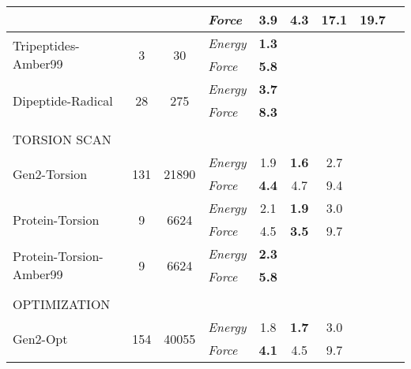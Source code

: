 \documentclass[varwidth]{standalone}
\newcommand{\widthbetweentype}{7pt}
\begin{document}
\begin{adjustbox}{width=\textwidth,center}
\begin{tabular}{l c c l c c c c c}
                                   &                       &                         & \textit{Force}  & \textbf{3.9} & 4.3 & 17.1 & 19.7\\
\hline
\multirow{2}{*}{Tripeptides-Amber99} & \multirow{2}{*}{3} & \multirow{2}{*}{30} & \textit{Energy} & \textbf{1.3} &  &  & \\
                                   &                       &                         & \textit{Force}  & \textbf{5.8} &  &  & \\
\hline
\multirow{2}{*}{Dipeptide-Radical} & \multirow{2}{*}{28} & \multirow{2}{*}{275} & \textit{Energy} & \textbf{3.7} &  &  & \\
                                   &                       &                         & \textit{Force}  & \textbf{8.3} &  &  & \\
\hline
\multicolumn{8}{l}{\vspace{\widthbetweentype}} \\[-1em]
\multicolumn{8}{l}{\small{TORSION SCAN}} \\\hline
\multirow{2}{*}{Gen2-Torsion} & \multirow{2}{*}{131} & \multirow{2}{*}{21890} & \textit{Energy} & 1.9 & \textbf{1.6} & 2.7 & \\
                                   &                       &                         & \textit{Force}  & \textbf{4.4} & 4.7 & 9.4 & \\
\hline
\multirow{2}{*}{Protein-Torsion} & \multirow{2}{*}{9} & \multirow{2}{*}{6624} & \textit{Energy} & 2.1 & \textbf{1.9} & 3.0 & \\
                                   &                       &                         & \textit{Force}  & 4.5 & \textbf{3.5} & 9.7 & \\
\hline
\multirow{2}{*}{Protein-Torsion-Amber99} & \multirow{2}{*}{9} & \multirow{2}{*}{6624} & \textit{Energy} & \textbf{2.3} &  &  & \\
                                   &                       &                         & \textit{Force}  & \textbf{5.8} &  &  & \\
\hline
\multicolumn{8}{l}{\vspace{\widthbetweentype}} \\[-1em]
\multicolumn{8}{l}{\small{OPTIMIZATION}} \\\hline
\multirow{2}{*}{Gen2-Opt} & \multirow{2}{*}{154} & \multirow{2}{*}{40055} & \textit{Energy} & 1.8 & \textbf{1.7} & 3.0 & \\
                                   &                       &                         & \textit{Force}  & \textbf{4.1} & 4.5 & 9.7 & \\

\end{tabular}
\end{adjustbox}
\end{document}
